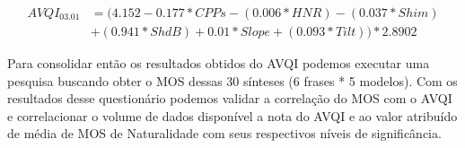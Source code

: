 \documentclass{article}
\begin{document}
\begin{equation}
	\begin{split}
    	AVQI_{03.01}& = (4.152 - 0.177*CPPs - (0.006*HNR) - (0.037*Shim)\\ 
    	&+ (0.941*ShdB) + 0.01*Slope + (0.093*Tilt))*2.8902
	\end{split}
\end{equation}

Para consolidar então os resultados obtidos do AVQI podemos executar uma pesquisa buscando obter o MOS dessas 30 sínteses (6 frases * 5 modelos). Com os resultados desse questionário podemos validar a correlação do MOS com o AVQI e correlacionar o volume de dados disponível a nota do AVQI e ao valor atribuído de média de MOS de Naturalidade com seus respectivos níveis de significância.

  
  
\end{document}
